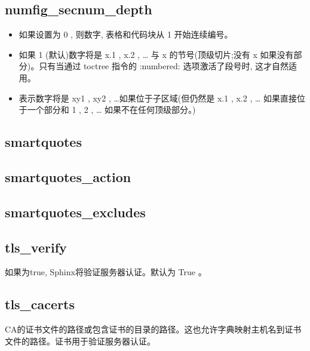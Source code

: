 \documentclass[a4paper,10pt,english]{sphinxmanual}
\begin{document}
\subsection{numfig\_secnum\_depth}
\label{\detokenize{sphinx_conf:numfig-secnum-depth}}\begin{itemize}
\item {} 
\sphinxAtStartPar
如果设置为 0 , 则数字, 表格和代码块从 1 开始连续编号。

\item {} 
\sphinxAtStartPar
如果 1 (默认)数字将是 x.1 , x.2 , … 与 x 的节号(顶级切片;没有 x 如果没有部分)。只有当通过 toctree 指令的 :numbered: 选项激活了段号时, 这才自然适用。

\item {} 
 表示数字将是 xy1 , xy2 , …如果位于子区域(但仍然是 x.1 , x.2 , … 如果直接位于一个部分和 1 , 2 , … 如果不在任何顶级部分。)

\end{itemize}


\subsection{smartquotes}
\label{\detokenize{sphinx_conf:smartquotes}}

\subsection{smartquotes\_action}
\label{\detokenize{sphinx_conf:smartquotes-action}}

\subsection{smartquotes\_excludes}
\label{\detokenize{sphinx_conf:smartquotes-excludes}}

\subsection{tls\_verify}
\label{\detokenize{sphinx_conf:tls-verify}}
\sphinxAtStartPar
如果为true, Sphinx将验证服务器认证。默认为 True 。


\subsection{tls\_cacerts}
\label{\detokenize{sphinx_conf:tls-cacerts}}
\sphinxAtStartPar
CA的证书文件的路径或包含证书的目录的路径。这也允许字典映射主机名到证书文件的路径。证书用于验证服务器认证。
\end{document}
